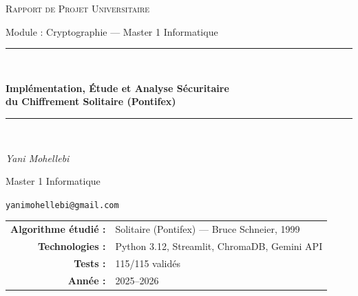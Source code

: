 \documentclass[12pt,a4paper]{article}
\begin{document}
\begin{titlepage}
    \centering
    \vspace*{1.5cm}

    {\scshape\Large Rapport de Projet Universitaire \par}
    \vspace{0.4cm}
    {\large Module : Cryptographie — Master 1 Informatique \par}
    \vspace{1.5cm}

    \rule{\linewidth}{0.5pt}\\[0.4cm]
    {\huge\bfseries Implémentation, Étude et Analyse Sécuritaire\\[0.3cm]
    du Chiffrement Solitaire (Pontifex)\par}
    \rule{\linewidth}{0.5pt}\\[2cm]

    {\Large\itshape Yani Mohellebi\par}
    \vspace{0.5cm}
    {\large Master 1 Informatique\par}
    \vspace{0.3cm}
    {\normalsize \texttt{yanimohellebi@gmail.com}\par}

    \vfill

    \begin{tabular}{rl}
        \textbf{Algorithme étudié :} & Solitaire (Pontifex) — Bruce Schneier, 1999 \\
        \textbf{Technologies :} & Python 3.12, Streamlit, ChromaDB, Gemini API \\
        \textbf{Tests :} & 115/115 validés \\
        \textbf{Année :} & 2025--2026 \\
    \end{tabular}
\end{titlepage}

\newpage
\tableofcontents
\newpage
\listoffigures
\newpage
\end{document}
